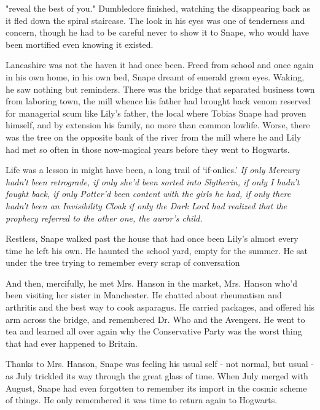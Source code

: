 "{\el}reveal the best of you." Dumbledore finished, watching the disappearing back as it fled down the spiral staircase. The look in his eyes was one of tenderness and concern, though he had to be careful never to show it to Snape, who would have been mortified even knowing it existed.

Lancashire was not the haven it had once been. Freed from school and once again in his own home, in his own bed, Snape dreamt of emerald green eyes. Waking, he saw nothing but reminders. There was the bridge that separated business town from laboring town, the mill whence his father had brought back venom reserved for managerial scum like Lily's father, the local where Tobias Snape had proven himself, and by extension his family, no more than common lowlife. Worse, there was the tree on the opposite bank of the river from the mill where he and Lily had met so often in those now-magical years before they went to Hogwarts.

Life was a lesson in might have been, a long trail of `if-onlies.' \emph{If only Mercury hadn't been retrograde, if only she'd been sorted into Slytherin, if only I hadn't fought back, if only Potter'd been content with the girls he had, if only there hadn't been an Invisibility Cloak{\el} if only the Dark Lord had realized that the prophecy referred to{\el} the other one, the auror's child.}

Restless, Snape walked past the house that had once been Lily's almost every time he left his own. He haunted the school yard, empty for the summer. He sat under the tree trying to remember every scrap of conversation{\el}

And then, mercifully, he met Mrs. Hanson in the market, Mrs. Hanson who'd been visiting her sister in Manchester. He chatted about rheumatism and arthritis and the best way to cook asparagus. He carried packages, and offered his arm across the bridge, and remembered Dr. Who and the Avengers. He went to tea and learned all over again why the Conservative Party was the worst thing that had ever happened to Britain.

Thanks to Mrs. Hanson, Snape was feeling his usual self - not normal, but usual - as July trickled its way through the great glass of time. When July merged with August, Snape had even forgotten to remember its import in the cosmic scheme of things. He only remembered it was time to return again to Hogwarts.


